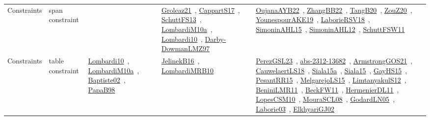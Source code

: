 {\begin{longtable}{lp{3cm}>{\raggedright\arraybackslash}p{6cm}>{\raggedright\arraybackslash}p{6cm}>{\raggedright\arraybackslash}p{8cm}}
Constraints & span constraint &  & \href{../works/Groleaz21.pdf}{Groleaz21}~\cite{Groleaz21}, \href{../works/CappartS17.pdf}{CappartS17}~\cite{CappartS17}, \href{../works/SchuttFS13.pdf}{SchuttFS13}~\cite{SchuttFS13}, \href{../works/LombardiM10a.pdf}{LombardiM10a}~\cite{LombardiM10a}, \href{../works/Lombardi10.pdf}{Lombardi10}~\cite{Lombardi10}, \href{../works/Darby-DowmanLMZ97.pdf}{Darby-DowmanLMZ97}~\cite{Darby-DowmanLMZ97} & \href{../works/OujanaAYB22.pdf}{OujanaAYB22}~\cite{OujanaAYB22}, \href{../works/ZhangBB22.pdf}{ZhangBB22}~\cite{ZhangBB22}, \href{../works/TangB20.pdf}{TangB20}~\cite{TangB20}, \href{../works/ZouZ20.pdf}{ZouZ20}~\cite{ZouZ20}, \href{../works/YounespourAKE19.pdf}{YounespourAKE19}~\cite{YounespourAKE19}, \href{../works/LaborieRSV18.pdf}{LaborieRSV18}~\cite{LaborieRSV18}, \href{../works/SimoninAHL15.pdf}{SimoninAHL15}~\cite{SimoninAHL15}, \href{../works/SimoninAHL12.pdf}{SimoninAHL12}~\cite{SimoninAHL12}, \href{../works/SchuttFSW11.pdf}{SchuttFSW11}~\cite{SchuttFSW11}\\
Constraints & table constraint & \href{../works/Lombardi10.pdf}{Lombardi10}~\cite{Lombardi10}, \href{../works/LombardiM10a.pdf}{LombardiM10a}~\cite{LombardiM10a}, \href{../works/Baptiste02.pdf}{Baptiste02}~\cite{Baptiste02}, \href{../works/PapaB98.pdf}{PapaB98}~\cite{PapaB98} & \href{../works/JelinekB16.pdf}{JelinekB16}~\cite{JelinekB16}, \href{../works/LombardiMRB10.pdf}{LombardiMRB10}~\cite{LombardiMRB10} & \href{../works/PerezGSL23.pdf}{PerezGSL23}~\cite{PerezGSL23}, \href{../works/abs-2312-13682.pdf}{abs-2312-13682}~\cite{abs-2312-13682}, \href{../works/ArmstrongGOS21.pdf}{ArmstrongGOS21}~\cite{ArmstrongGOS21}, \href{../works/CauwelaertLS18.pdf}{CauwelaertLS18}~\cite{CauwelaertLS18}, \href{../works/Siala15a.pdf}{Siala15a}~\cite{Siala15a}, \href{../works/Siala15.pdf}{Siala15}~\cite{Siala15}, \href{../works/GayHS15.pdf}{GayHS15}~\cite{GayHS15}, \href{../works/PesantRR15.pdf}{PesantRR15}~\cite{PesantRR15}, \href{../works/MelgarejoLS15.pdf}{MelgarejoLS15}~\cite{MelgarejoLS15}, \href{../works/LimtanyakulS12.pdf}{LimtanyakulS12}~\cite{LimtanyakulS12}, \href{../works/BeniniLMR11.pdf}{BeniniLMR11}~\cite{BeniniLMR11}, \href{../works/BeckFW11.pdf}{BeckFW11}~\cite{BeckFW11}, \href{../works/HermenierDL11.pdf}{HermenierDL11}~\cite{HermenierDL11}, \href{../works/LopesCSM10.pdf}{LopesCSM10}~\cite{LopesCSM10}, \href{../works/MouraSCL08.pdf}{MouraSCL08}~\cite{MouraSCL08}, \href{../works/GodardLN05.pdf}{GodardLN05}~\cite{GodardLN05}, \href{../works/Laborie03.pdf}{Laborie03}~\cite{Laborie03}, \href{../works/ElkhyariGJ02.pdf}{ElkhyariGJ02}~\cite{ElkhyariGJ02}\\
\end{longtable}
}

